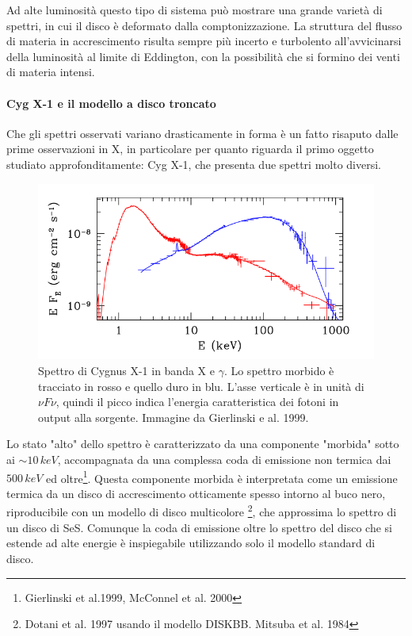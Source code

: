\documentclass[a4paperbi]{article}
\begin{document}
	Ad alte luminosità questo tipo di sistema può mostrare una grande varietà di spettri, in cui il disco è deformato dalla comptonizzazione. La struttura del flusso di materia in accrescimento risulta sempre più incerto e turbolento all'avvicinarsi della luminosità al limite di Eddington, con la possibilità che si formino dei venti di materia intensi.

\paragraph{Cyg X-1 e il modello a disco troncato}

Che gli spettri osservati variano drasticamente in forma è un fatto risaputo dalle prime osservazioni in X, in particolare per quanto riguarda il primo oggetto studiato approfonditamente: Cyg X-1, che presenta due spettri molto diversi.

	\begin{figure}[H]
		\centering
		\includegraphics[width=0.8\linewidth]{CygX1}
		\caption{Spettro di Cygnus X-1 in banda X e $\gamma$. Lo spettro morbido è tracciato in rosso e quello duro in blu. L'asse verticale è in unità di $\nu F\nu$, quindi il picco indica l'energia caratteristica dei fotoni in output alla sorgente. Immagine da Gierlinski e al. 1999.}
		\label{fig:CygX1}
	\end{figure}
	
Lo stato "alto" dello spettro è caratterizzato da una componente "morbida" sotto ai $\sim10\,keV$, accompagnata da una complessa coda di emissione non termica dai $500\,keV$ ed oltre\footnote{Gierlinski et al.1999, McConnel et al. 2000}. Questa componente morbida è interpretata come un emissione termica da un disco di accrescimento otticamente spesso intorno al buco nero, riproducibile con un modello di disco multicolore \footnote{Dotani et al. 1997 usando il modello DISKBB. Mitsuba et al. 1984}, che approssima lo spettro di un disco di SeS. Comunque la coda di emissione oltre lo spettro del disco che si estende ad alte energie è inspiegabile utilizzando solo il modello standard di disco.
\end{document}
